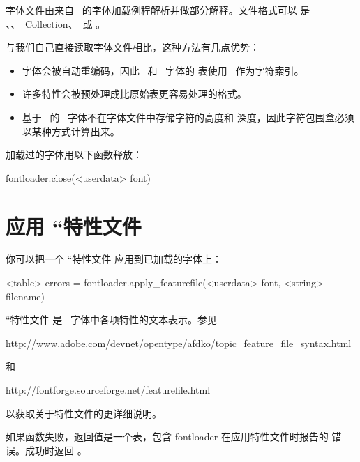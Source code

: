 字体文件由来自 \FONTFORGE\ 的字体加载例程解析并做部分解释。文件格式可以
是 \OPENTYPE、\TRUETYPE、\TRUETYPE\ Collection、\CFF\ 或 \TYPEONE。

与我们自己直接读取字体文件相比，这种方法有几点优势：

\begin{itemize}\item 字体会被自动重编码，因此 \TRUETYPE\ 和 \OPENTYPE\ 字体的
     表使用 \UNICODE\ 作为字符索引。

\item 许多特性会被预处理成比原始表更容易处理的格式。

\item 基于 \POSTSCRIPT\ 的 \OPENTYPE\ 字体不在字体文件中存储字符的高度和
    深度，因此字符包围盒必须以某种方式计算出来。

\end{itemize}

加载过的字体用以下函数释放：

\begin{typing}
fontloader.close(<userdata> font)
\end{typing}

\section{应用 ``特性文件}


你可以把一个 ``特性文件 应用到已加载的字体上：

\begin{typing}
<table> errors = fontloader.apply_featurefile(<userdata> font, <string> filename)
\end{typing}

``特性文件 是 \OPENTYPE\ 字体中各项特性的文本表示。参见

\begin{typing}
http://www.adobe.com/devnet/opentype/afdko/topic_feature_file_syntax.html
\end{typing}

和

\begin{typing}
http://fontforge.sourceforge.net/featurefile.html
\end{typing}

以获取关于特性文件的更详细说明。

如果函数失败，返回值是一个表，包含 fontloader 在应用特性文件时报告的
错误。成功时返回 。

